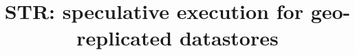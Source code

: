 \documentclass[preprint]{sigplanconf-eurosys}
\begin{document}
\newcommand\VRule[1][\arrayrulewidth]{\vrule width #1}
\newcommand{\specula}{STR\xspace}

\title{STR: speculative execution for geo-replicated datastores}




\end{document}
